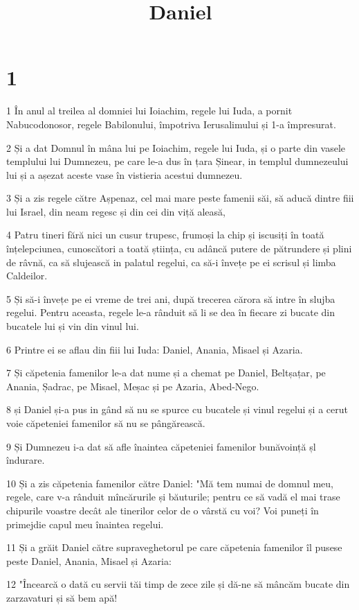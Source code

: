 

\title{Daniel}


\chapter{1}

\par 1 În anul al treilea al domniei lui Ioiachim, regele lui Iuda, a pornit Nabucodonosor, regele Babilonului, împotriva Ierusalimului și 1-a împresurat.
\par 2 Și a dat Domnul în mâna lui pe Ioiachim, regele lui Iuda, și o parte din vasele templului lui Dumnezeu, pe care le-a dus în țara Șinear, in templul dumnezeului lui și a așezat aceste vase în vistieria acestui dumnezeu.
\par 3 Și a zis regele către Așpenaz, cel mai mare peste famenii săi, să aducă dintre fiii lui Israel, din neam regesc și din cei din viță aleasă,
\par 4 Patru tineri fără nici un cusur trupesc, frumoși la chip și iscusiți în toată înțelepciunea, cunoscători a toată știința, cu adâncă putere de pătrundere și plini de râvnă, ca să slujească in palatul regelui, ca să-i învețe pe ei scrisul și limba Caldeilor.
\par 5 Și să-i învețe pe ei vreme de trei ani, după trecerea cărora să intre în slujba regelui. Pentru aceasta, regele le-a rânduit să li se dea în fiecare zi bucate din bucatele lui și vin din vinul lui.
\par 6 Printre ei se aflau din fiii lui Iuda: Daniel, Anania, Misael și Azaria.
\par 7 Și căpetenia famenilor le-a dat nume și a chemat pe Daniel, Beltșațar, pe Anania, Șadrac, pe Misael, Meșac și pe Azaria, Abed-Nego.
\par 8 și Daniel și-a pus in gând să nu se spurce cu bucatele și vinul regelui și a cerut voie căpeteniei famenilor să nu se pângărească.
\par 9 Și Dumnezeu i-a dat să afle înaintea căpeteniei famenilor bunăvoință șl îndurare.
\par 10 Și a zis căpetenia famenilor către Daniel: "Mă tem numai de domnul meu, regele, care v-a rânduit mîncărurile și băuturile; pentru ce să vadă el mai trase chipurile voastre decât ale tinerilor celor de o vârstă cu voi? Voi puneți în primejdie capul meu înaintea regelui.
\par 11 Și a grăit Daniel către supraveghetorul pe care căpetenia famenilor îl pusese peste Daniel, Anania, Misael și Azaria:
\par 12 "Încearcă o dată cu servii tăi timp de zece zile și dă-ne să mâncăm bucate din zarzavaturi și să bem apă!
